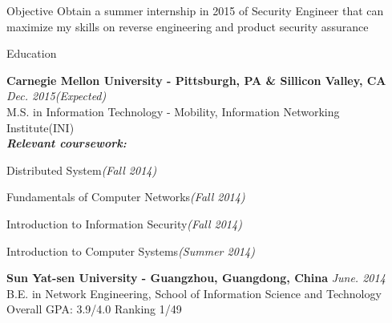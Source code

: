 \documentclass{resume} %
\begin{document}
\begin{rSection}{Objective}
Obtain a summer internship in 2015 of Security Engineer that can maximize my skills on reverse engineering and product security assurance

\end{rSection}


\begin{rSection}{Education}

{\bf Carnegie Mellon University - Pittsburgh, PA \& Sillicon Valley, CA} \hfill {\em Dec. 2015(Expected)} \\ 
M.S. in Information Technology - Mobility, Information Networking Institute(INI) \\
{\bf\em Relevant coursework:}
\begin{inparaenum}[\itshape 1\upshape)]
\item Distributed System{\em(Fall 2014)}
\item Fundamentals of Computer Networks{\em(Fall 2014)}
\item Introduction to Information Security{\em(Fall 2014)}
\item Introduction to Computer Systems{\em(Summer 2014)}
\end{inparaenum}


{\bf Sun Yat-sen University - Guangzhou, Guangdong, China} \hfill {\em June. 2014} \\ 
B.E. in Network Engineering, 
School of Information Science and Technology \\
Overall GPA: 3.9/4.0 Ranking 1/49

\end{rSection}
\end{document}

